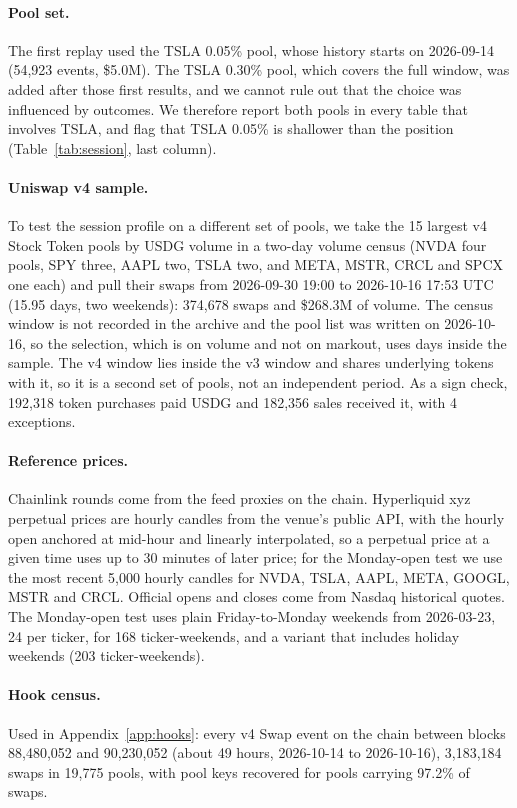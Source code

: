 \documentclass[11pt]{article}
\newcommand{\USD}{\$}
\begin{document}
\paragraph{Pool set.} The first replay used the TSLA 0.05\% pool, whose history starts on 2026-09-14 (54,923 events, \USD5.0M). The TSLA 0.30\% pool, which covers the full window, was added after those first results, and we cannot rule out that the choice was influenced by outcomes. We therefore report both pools in every table that involves TSLA, and flag that TSLA 0.05\% is shallower than the position (Table~\ref{tab:session}, last column).

\paragraph{Uniswap v4 sample.} To test the session profile on a different set of pools, we take the 15 largest v4 Stock Token pools by USDG volume in a two-day volume census (NVDA four pools, SPY three, AAPL two, TSLA two, and META, MSTR, CRCL and SPCX one each) and pull their swaps from 2026-09-30 19:00 to 2026-10-16 17:53 UTC (15.95 days, two weekends): 374,678 swaps and \USD268.3M of volume. The census window is not recorded in the archive and the pool list was written on 2026-10-16, so the selection, which is on volume and not on markout, uses days inside the sample. The v4 window lies inside the v3 window and shares underlying tokens with it, so it is a second set of pools, not an independent period. As a sign check, 192,318 token purchases paid USDG and 182,356 sales received it, with 4 exceptions.

\paragraph{Reference prices.} Chainlink rounds come from the feed proxies on the chain. Hyperliquid xyz perpetual prices are hourly candles from the venue's public API, with the hourly open anchored at mid-hour and linearly interpolated, so a perpetual price at a given time uses up to 30 minutes of later price; for the Monday-open test we use the most recent 5,000 hourly candles for NVDA, TSLA, AAPL, META, GOOGL, MSTR and CRCL. Official opens and closes come from Nasdaq historical quotes. The Monday-open test uses plain Friday-to-Monday weekends from 2026-03-23, 24 per ticker, for 168 ticker-weekends, and a variant that includes holiday weekends (203 ticker-weekends).

\paragraph{Hook census.} Used in Appendix~\ref{app:hooks}: every v4 Swap event on the chain between blocks 88,480,052 and 90,230,052 (about 49 hours, 2026-10-14 to 2026-10-16), 3,183,184 swaps in 19,775 pools, with pool keys recovered for pools carrying 97.2\% of swaps.
\end{document}
